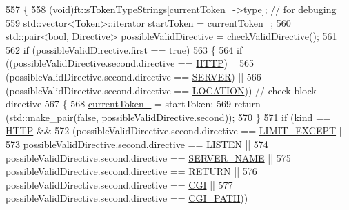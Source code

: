 \begin{DoxyCode}
557     \{
558         (void)\hyperlink{namespaceft_a1b9b00bc284da71346729142b8560e03}{ft::sTokenTypeStrings}[\hyperlink{classft_1_1_parser_a942c5b794d108f144c5b5028aaa34cb6}{currentToken\_}->type]; \textcolor{comment}{// for debuging}
559         std::vector<Token>::iterator startToken = \hyperlink{classft_1_1_parser_a942c5b794d108f144c5b5028aaa34cb6}{currentToken\_};
560         std::pair<bool, Directive> possibleValidDirective = \hyperlink{classft_1_1_parser_ad48298d21629daf7c9a31e101bf322ba}{checkValidDirective}();
561 
562         \textcolor{keywordflow}{if} (possibleValidDirective.first == \textcolor{keyword}{true})
563         \{
564             \textcolor{keywordflow}{if} ((possibleValidDirective.second.directive == \hyperlink{namespaceft_a5a5554dff10f0dc50bae4cc5825ad75da67e044074f46e6cea22788527da5f02e}{HTTP}) ||
565                     (possibleValidDirective.second.directive == \hyperlink{namespaceft_a5a5554dff10f0dc50bae4cc5825ad75da67c96b24b23bcb408bae7626730a04b7}{SERVER}) ||
566                     (possibleValidDirective.second.directive == \hyperlink{namespaceft_a5a5554dff10f0dc50bae4cc5825ad75da1e9e3944b93fde52c7c92e1e15dcaf4a}{LOCATION})) \textcolor{comment}{// check block directive}
567             \{
568                 \hyperlink{classft_1_1_parser_a942c5b794d108f144c5b5028aaa34cb6}{currentToken\_} = startToken;
569                 \textcolor{keywordflow}{return} (std::make\_pair(\textcolor{keyword}{false}, possibleValidDirective.second));
570             \}
571             \textcolor{keywordflow}{if} (kind == \hyperlink{namespaceft_a5a5554dff10f0dc50bae4cc5825ad75da67e044074f46e6cea22788527da5f02e}{HTTP} && 
572                 (possibleValidDirective.second.directive == \hyperlink{namespaceft_a5a5554dff10f0dc50bae4cc5825ad75da25b0e84438d71cc28e97f17a01cfde7a}{LIMIT\_EXCEPT} || 
573                 possibleValidDirective.second.directive == \hyperlink{namespaceft_a5a5554dff10f0dc50bae4cc5825ad75da331ec9878c0ed22e62de969d4b96b5bb}{LISTEN} || 
574                 possibleValidDirective.second.directive == \hyperlink{namespaceft_a5a5554dff10f0dc50bae4cc5825ad75da8e7adb687472b53e3ed632cbcb949d88}{SERVER\_NAME} || 
575                 possibleValidDirective.second.directive == \hyperlink{namespaceft_a5a5554dff10f0dc50bae4cc5825ad75da520e09ffec033636dba711f3441cc600}{RETURN} || 
576                 possibleValidDirective.second.directive == \hyperlink{namespaceft_a5a5554dff10f0dc50bae4cc5825ad75da7b2e2f10add9bba874f82f39725423c5}{CGI} || 
577                 possibleValidDirective.second.directive == \hyperlink{namespaceft_a5a5554dff10f0dc50bae4cc5825ad75da874adc6c563690bc7a39ac6a0060e38a}{CGI\_PATH}))

\end{DoxyCode}
